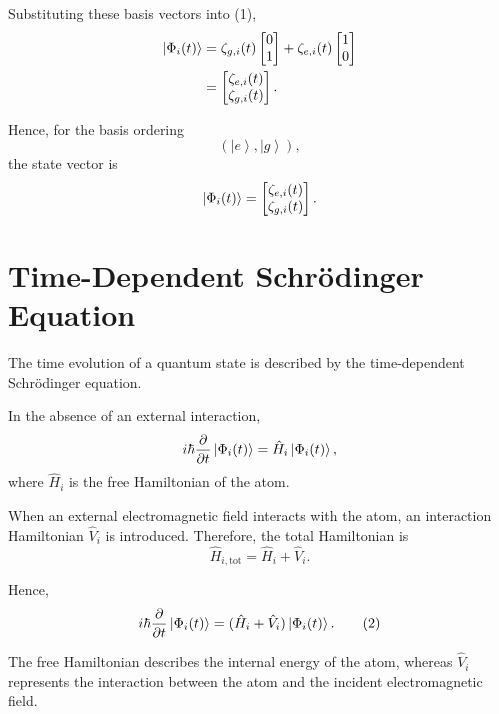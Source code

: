 \documentclass[12pt,a4paper]{article}
\newcommand{\ketg}{\left|g\right\rangle}
\newcommand{\kete}{\left|e\right\rangle}
\begin{document}
Substituting these basis vectors into (1),
\[
\begin{aligned}
\ket{\Phi_i(t)}
&=
\zeta_{g,i}(t)
\begin{bmatrix}
0\\
1
\end{bmatrix}
+
\zeta_{e,i}(t)
\begin{bmatrix}
1\\
0
\end{bmatrix}\\
&=
\begin{bmatrix}
\zeta_{e,i}(t)\\
\zeta_{g,i}(t)
\end{bmatrix}.
\end{aligned}
\]

Hence, for the basis ordering
\[
(\kete,\ketg),
\]
the state vector is
\[
\ket{\Phi_i(t)}
=
\begin{bmatrix}
\zeta_{e,i}(t)\\
\zeta_{g,i}(t)
\end{bmatrix}.
\]

\section{Time-Dependent Schr\"odinger Equation}

The time evolution of a quantum state is described by the
time-dependent Schr\"odinger equation.

In the absence of an external interaction,
\[
i\hbar
\frac{\partial}{\partial t}
\ket{\Phi_i(t)}
=
\hat H_i
\ket{\Phi_i(t)},
\]
where \(\hat H_i\) is the free Hamiltonian of the atom.

When an external electromagnetic field interacts with the atom,
an interaction Hamiltonian \(\hat V_i\) is introduced. Therefore,
the total Hamiltonian is
\[
\hat H_{i,\mathrm{tot}}
=
\hat H_i+\hat V_i.
\]

Hence,
\begin{equation}
i\hbar
\frac{\partial}{\partial t}
\ket{\Phi_i(t)}
=
(\hat H_i+\hat V_i)
\ket{\Phi_i(t)}.
\tag{2}
\end{equation}

The free Hamiltonian describes the internal energy of the atom,
whereas \(\hat V_i\) represents the interaction between the atom
and the incident electromagnetic field.

\end{document}
